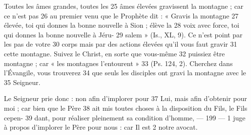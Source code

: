 Toutes les âmes grandes, toutes les	 
25	 	âmes élevées gravissent la montagne ; car ce n'est pas	 
26	 	au premier venu que le Prophète dit : « Gravis la montagne	 
27	 	élevée, toi qui donnes la bonne nouvelle à Sion ; élève la	 
28	 	voix avec force, toi qui donnes la bonne nouvelle à Jéru-	 
29	 	salem » (Is., XL, 9). Ce n'est point par les pas de votre	 
30	 	corps mais par des actions élevées qu'il vous faut gravir	 
31	 	cette montagne. Suivez le Christ, en sorte que vous-même	 
32	 	puissiez être montagne ; car « les montagnes l'entourent »	 
33	 	(Ps. 124, 2). Cherchez dans l'Évangile, vous trouverez	 
34	 	que seuls les disciples ont gravi la montagne avec le	 
35	 	Seigneur.

Le Seigneur prie donc : non afin d'implorer pour	 
37	 	Lui, mais afin d'obtenir pour moi ; car bien que le Père	 
38	 	ait mis toutes choses à la disposition du Fils, le Fils cepen-	 
39	 	dant, pour réaliser pleinement sa condition d'homme,	 
 	--- 199 ---	 
1	 	juge à propos d'implorer le Père pour nous : car Il est	 
2	 	notre avocat.